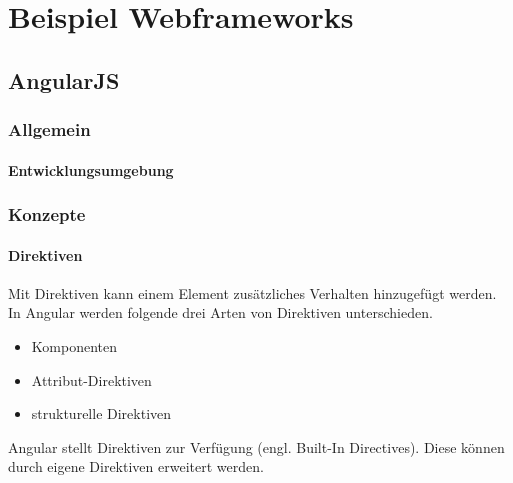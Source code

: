 
\chapter{Beispiel Webframeworks}

\section{AngularJS}

\subsection{Allgemein}

\subsubsection{}


\subsubsection{Entwicklungsumgebung}


\subsection{Konzepte}


\subsubsection{Direktiven}


Mit Direktiven kann einem Element zusätzliches Verhalten hinzugefügt werden. \autocite[vgl.][265]{Steyer.2017} In Angular werden folgende drei Arten von Direktiven unterschieden. \autocite[vgl.]{Google.}

\begin{itemize}
	\item Komponenten
	\item Attribut-Direktiven
	\item strukturelle Direktiven 
\end{itemize}

Angular stellt Direktiven zur Verfügung (engl. Built-In Directives). Diese können durch eigene Direktiven erweitert werden. \autocite[vgl.][261]{Freeman.2018}

